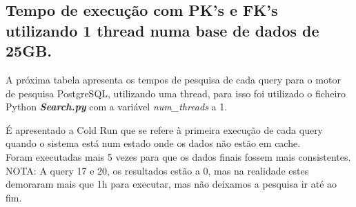 \documentclass{article}
\begin{document}
  \clearpage

\subsection{Tempo de execução com PK's e FK's utilizando 1 thread numa base de dados de 25GB.}
\texttt{}\par A próxima tabela apresenta os tempos de pesquisa de cada query para o motor de pesquisa PostgreSQL, utilizando uma thread, para isso foi utilizado o ficheiro Python \textbf{\textit{Search.py}}  com a variável \textit{num\_threads} a 1. 
\texttt{}\par É apresentado a Cold Run que se refere à primeira execução de cada query quando o sistema está num estado onde os dados não estão em cache.\\
Foram executadas mais 5 vezes para que os dados finais fossem mais consistentes.\\
NOTA: A query 17 e 20, os resultados estão a 0, mas na realidade estes demoraram mais que 1h para executar, mas não deixamos a pesquisa ir até ao fim.
\end{document}
